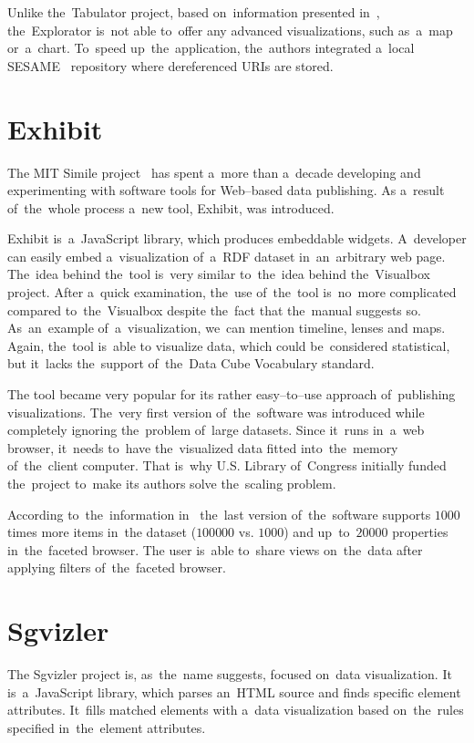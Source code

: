 Unlike the~Tabulator project, based on~information presented in~\cite{explorator},
the~Explorator is~not able to~offer any advanced visualizations, such as~a~map or~a~chart. To~speed up~the~application, the~authors integrated a~local SESAME~\cite{sesame} 
repository where dereferenced URIs are stored.

\section{Exhibit}
The MIT Simile project~\cite{mit-simile} has spent a~more than a~decade
developing and experimenting with software tools for Web--based data publishing.
As a~result of~the~whole process a~new tool, Exhibit, was introduced.

Exhibit is~a~JavaScript library, which produces embeddable widgets. A~developer can
easily embed a~visualization of~a~RDF dataset in~an~arbitrary web page. The~idea behind 
the~tool is~very similar to~the~idea behind the~Visualbox project. After a~quick 
examination, the~use of~the~tool is~no~more complicated compared to~the~Visualbox despite the~fact that the~manual suggests so. As~an~example of~a~visualization, we~can mention timeline, lenses and maps. Again, the~tool is~able 
to visualize data, which could be~considered statistical, but it~lacks the~support of~the~Data Cube Vocabulary standard.

The tool became very popular for its rather easy--to--use 
approach of~publishing visualizations. The~very first version of~the~software
was introduced while completely ignoring the~problem of~large datasets.
Since it~runs in~a~web browser, it~needs to~have the~visualized data
fitted into~the~memory of~the~client 
computer. That is~why U.S. Library of~Congress initially funded the~project to~make its authors solve the~scaling problem.

According to~the~information in~\cite{exhibit}
the~last version of~the~software supports $1000$ times more items in~the
dataset ($100 000$ vs. $1000$) and up~to~$20 000$ properties in~the~faceted browser. 
The user is~able to~share views on~the~data after applying filters of~the~faceted browser. 

\section{Sgvizler}
The Sgvizler project is, as~the~name suggests, focused on~data visualization. 
It is~a~JavaScript library, which parses an~HTML source and finds specific 
element attributes. It~fills matched elements with a~data visualization based on~the~rules specified in~the~element attributes.

